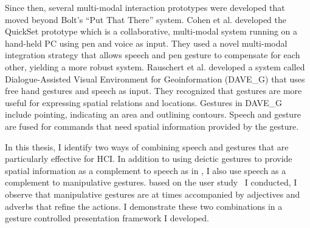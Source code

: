 Since then, several multi-modal interaction prototypes were 
developed that moved beyond Bolt's ``Put That There'' system. Cohen et al. 
\cite{Cohen97} developed the QuickSet prototype which is a collaborative, 
multi-modal system running on a hand-held PC using pen and voice as input. They 
used a novel multi-modal integration strategy that allows speech and pen gesture 
to compensate for each other, yielding a more robust system. Rauschert et al. 
\cite{Rauschert02} developed a system called Dialogue-Assisted Visual 
Environment for Geoinformation (DAVE\_G) that uses free hand gestures and speech
as input. They recognized that gestures are more useful for expressing spatial 
relations and locations. Gestures in DAVE\_G include pointing, indicating an 
area and outlining contours. Speech and gesture are fused for commands that need
spatial information provided by the gesture. 

In this thesis, I identify two ways of combining speech and gestures that are
particularly effective for HCI.
In addition to using deictic gestures to provide spatial information as a
complement to speech as in \cite{Rauschert02}, I also use speech as a
complement to manipulative gestures.
based on the user study~\cite{yin10} I
conducted, I observe that manipulative gestures are at times accompanied by
adjectives and adverbs that refine the actions. I demonstrate these two
combinations in a gesture controlled presentation framework I developed.
